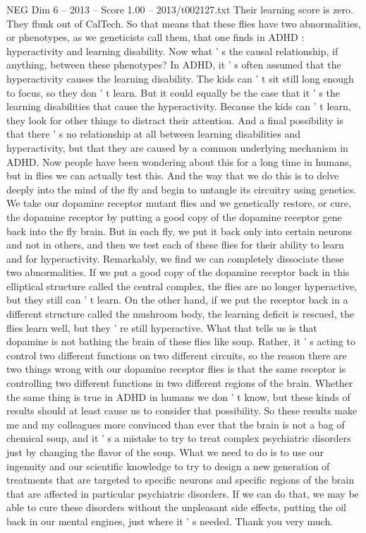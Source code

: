 \begin{textsample}{NEG Dim 6 – 2013 – Score 1.00 – 2013/t002127.txt}
Their learning score is zero.
They flunk out of CalTech.
So that means that these flies have two abnormalities, or phenotypes, as we geneticists call them, that one finds in ADHD : hyperactivity and learning disability.
Now what ' s the causal relationship, if anything, between these phenotypes?
In ADHD, it ' s often assumed that the hyperactivity causes the learning disability.
The kids can ' t sit still long enough to focus, so they don ' t learn.
But it could equally be the case that it ' s the learning disabilities that cause the hyperactivity.
Because the kids can ' t learn, they look for other things to distract their attention.
And a final possibility is that there ' s no relationship at all between learning disabilities and hyperactivity, but that they are caused by a common underlying mechanism in ADHD.
Now people have been wondering about this for a long time in humans, but in flies we can actually test this.
And the way that we do this is to delve deeply into the mind of the fly and begin to untangle its circuitry using genetics.
We take our dopamine receptor mutant flies and we genetically restore, or cure, the dopamine receptor by putting a good copy of the dopamine receptor gene back into the fly brain.
But in each fly, we put it back only into certain neurons and not in others, and then we test each of these flies for their ability to learn and for hyperactivity.
Remarkably, we find we can completely dissociate these two abnormalities.
If we put a good copy of the dopamine receptor back in this elliptical structure called the central complex, the flies are no longer hyperactive, but they still can ' t learn.
On the other hand, if we put the receptor back in a different structure called the mushroom body, the learning deficit is rescued, the flies learn well, but they ' re still hyperactive.
What that tells us is that dopamine is not bathing the brain of these flies like soup.
Rather, it ' s acting to control two different functions on two different circuits, so the reason there are two things wrong with our dopamine receptor flies is that the same receptor is controlling two different functions in two different regions of the brain.
Whether the same thing is true in ADHD in humans we don ' t know, but these kinds of results should at least cause us to consider that possibility.
So these results make me and my colleagues more convinced than ever that the brain is not a bag of chemical soup, and it ' s a mistake to try to treat complex psychiatric disorders just by changing the flavor of the soup.
What we need to do is to use our ingenuity and our scientific knowledge to try to design a new generation of treatments that are targeted to specific neurons and specific regions of the brain that are affected in particular psychiatric disorders.
If we can do that, we may be able to cure these disorders without the unpleasant side effects, putting the oil back in our mental engines, just where it ' s needed.
Thank you very much.

\end{textsample}
